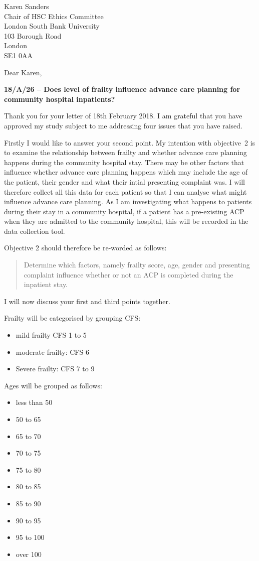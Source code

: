 \documentclass
[
	12pt,
	a4paper,
	oneside
]{letter}
\begin{document}
\begin{letter}{Karen Sanders\\
		Chair of HSC Ethics Committee\\
		London South Bank University\\
		103 Borough Road\\
		London\\
		SE1 0AA}
\opening{Dear Karen,}

\bigskip
\textbf{18/A/26 -- Does level of frailty influence advance care planning 
	for community hospital inpatients? }
\bigskip

Thank you for your letter of 18th February 2018. I am grateful that you have 
approved my study subject to me addressing four issues that you have raised.

Firstly I would like to answer your second point. My intention with objective~2
is to examine the relationship between frailty and whether advance care
planning happens during the community hospital stay. There may be other factors 
that influence whether advance care
planning happens which may include the age of the patient, their gender and what 
their intial presenting complaint was. I will therefore collect all this data for
each patient so that I can analyse what might influence advance care planning. As
I am investigating what happens to patients during their stay in a community
hospital, if a patient has a pre-existing ACP when they are admitted to the 
community hospital, this will be recorded in the data collection tool.

Objective 2 should therefore be re-worded as follows:
	\begin{quote}
		Determine which factors, namely frailty score, age, gender and
		presenting complaint influence whether or not an ACP is 
		completed during the inpatient stay.
	\end{quote}

I will now discuss your first and third points together.

Frailty will be categorised by grouping CFS:
	\begin{itemize}
		\item mild frailty CFS 1 to 5
		\item moderate frailty: CFS 6
		\item Severe frailty: CFS 7 to 9
	\end{itemize}

Ages will be grouped as follows:
	\begin{itemize}
		\item less than 50
		\item 50 to 65
		\item 65 to 70
		\item 70 to 75
 		\item 75 to 80
		\item 80 to 85
 		\item 85 to 90
 		\item 90 to 95
 		\item 95 to 100
 		\item over 100
	\end{itemize}


\end{letter}
\end{document}
